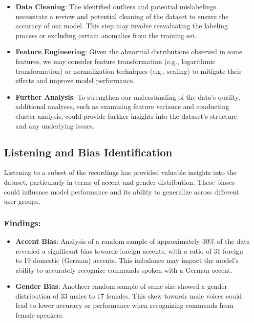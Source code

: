 \begin{itemize}
    \item \textbf{Data Cleaning}: The identified outliers and potential mislabelings necessitate a review and potential cleaning of the dataset to ensure the accuracy of our model. This step may involve reevaluating the labeling process or excluding certain anomalies from the training set.
    \item \textbf{Feature Engineering}: Given the abnormal distributions observed in some features, we may consider feature transformation (e.g., logarithmic transformation) or normalization techniques (e.g., scaling) to mitigate their effects and improve model performance.
    \item \textbf{Further Analysis}: To strengthen our understanding of the data's quality, additional analyses, such as examining feature variance and conducting cluster analysis, could provide further insights into the dataset's structure and any underlying issues.
\end{itemize}

\subsection{Listening and Bias Identification}

Listening to a subset of the recordings has provided valuable insights into the dataset, particularly in terms of accent and gender distribution. These biases could influence model performance and its ability to generalize across different user groups.

\subsubsection{Findings:}

\begin{itemize}
    \item \textbf{Accent Bias}: Analysis of a random sample of approximately 30\% of the data
    revealed a significant bias towards foreign accents, with a ratio of 31 foreign to
    19 domestic (German) accents.
    This imbalance may impact the model’s ability to accurately recognize commands spoken
    with a German accent.
    \item \textbf{Gender Bias}: Anotheer random sample of same size showed a gender distribution of 33 males to 17 females. This skew towards male voices could lead to lower accuracy or performance when recognizing commands from female speakers.
\end{itemize}

